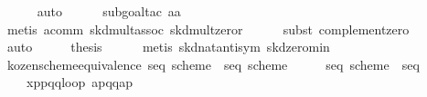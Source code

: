 \begin{isabellebody}
\ \ \ \ \isamarkupfalse%
\ auto\isanewline
\ \ \ \ \isamarkupfalse%
\ {}subgoal{}tac\ {}a{}{}{}a{}\ {}\ {}{}{}\isanewline
\ \ \ \ \isamarkupfalse%
\ {}metis\ a{}comm\ skd{}mult{}assoc\ skd{}mult{}zeror{}\isanewline
\ \ \ \ \isamarkupfalse%
\ {}subst\ complement{}zero{}\isanewline
\ \ \ \ \isamarkupfalse%
\ auto\isanewline
\ \ \isamarkupfalse%
\ \isamarkupfalse%
\ {}thesis\isanewline
\ \ \ \ \isamarkupfalse%
\ {}metis\ skd{}nat{}antisym\ skd{}zero{}min{}\isanewline
{}\isamarkupfalse%
%
\endisatagproof
{\isafoldproof}%
%
\isadelimproof
\isanewline
%
\endisadelimproof
\isanewline
{}\isamarkupfalse%
\ kozen{}scheme{}equivalence{}\ {}seq\ scheme{}\ {}\ seq\ scheme{}{}\isanewline
%
\isadelimproof
%
\endisadelimproof
%
\isatagproof
{}\isamarkupfalse%
\ {}\isanewline
\ \ \isamarkupfalse%
\ {}seq\ scheme{}\ {}\ seq\isanewline
\ \ \ \ {}x{}{}p{}{}{}p{}{}{}q{}{}{}{}q{}{}{}{}loop\ {}{}a{}{}p{}{}{}q{}{}{}{}q{}{}{}{}{}a{}{}p{}{}\isanewline

\end{isabellebody}
